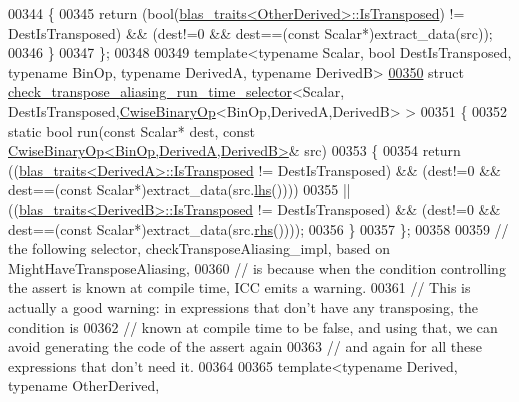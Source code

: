 \begin{DoxyCode}
00344   \{
00345     \textcolor{keywordflow}{return} (\textcolor{keywordtype}{bool}(\hyperlink{struct_eigen_1_1internal_1_1blas__traits}{blas\_traits<OtherDerived>::IsTransposed}) != 
      DestIsTransposed) && (dest!=0 && dest==(\textcolor{keyword}{const} Scalar*)extract\_data(src));
00346   \}
00347 \};
00348 
00349 \textcolor{keyword}{template}<\textcolor{keyword}{typename} Scalar, \textcolor{keywordtype}{bool} DestIsTransposed, \textcolor{keyword}{typename} BinOp, \textcolor{keyword}{typename} DerivedA, \textcolor{keyword}{typename} DerivedB>
\hyperlink{struct_eigen_1_1internal_1_1check__transpose__aliasing__run__time__selector_3_01_scalar_00_01_de23c75dd073d34cd03e0a4d86706317fc}{00350} \textcolor{keyword}{struct }\hyperlink{struct_eigen_1_1internal_1_1check__transpose__aliasing__run__time__selector}{check\_transpose\_aliasing\_run\_time\_selector}<Scalar,
      DestIsTransposed,\hyperlink{group___core___module_class_eigen_1_1_cwise_binary_op}{CwiseBinaryOp}<BinOp,DerivedA,DerivedB> >
00351 \{
00352   \textcolor{keyword}{static} \textcolor{keywordtype}{bool} run(\textcolor{keyword}{const} Scalar* dest, \textcolor{keyword}{const} 
      \hyperlink{group___core___module_class_eigen_1_1_cwise_binary_op}{CwiseBinaryOp<BinOp,DerivedA,DerivedB>}& src)
00353   \{
00354     \textcolor{keywordflow}{return} ((\hyperlink{struct_eigen_1_1internal_1_1blas__traits}{blas\_traits<DerivedA>::IsTransposed} != DestIsTransposed) &&
       (dest!=0 && dest==(\textcolor{keyword}{const} Scalar*)extract\_data(src.\hyperlink{group___core___module_a0f73e7585dfb54d41c1983e1e6a4b269}{lhs}())))
00355         || ((\hyperlink{struct_eigen_1_1internal_1_1blas__traits}{blas\_traits<DerivedB>::IsTransposed} != DestIsTransposed) &&
       (dest!=0 && dest==(\textcolor{keyword}{const} Scalar*)extract\_data(src.\hyperlink{group___core___module_a3a61cbdf6d1adaa62f012045b04b6d09}{rhs}())));
00356   \}
00357 \};
00358 
00359 \textcolor{comment}{// the following selector, checkTransposeAliasing\_impl, based on MightHaveTransposeAliasing,}
00360 \textcolor{comment}{// is because when the condition controlling the assert is known at compile time, ICC emits a warning.}
00361 \textcolor{comment}{// This is actually a good warning: in expressions that don't have any transposing, the condition is}
00362 \textcolor{comment}{// known at compile time to be false, and using that, we can avoid generating the code of the assert again}
00363 \textcolor{comment}{// and again for all these expressions that don't need it.}
00364 
00365 \textcolor{keyword}{template}<\textcolor{keyword}{typename} Derived, \textcolor{keyword}{typename} OtherDerived,

\end{DoxyCode}
